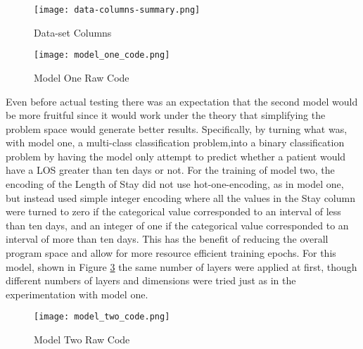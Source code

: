 \documentclass[sigconf,authorversion]{acmart}
\begin{document}
%
\begin{figure}[h]
    \centering
    \texttt{[image: data-columns-summary.png]}
    \caption{Data-set Columns}
    \label{fig: dataset cols}
\end{figure}
\begin{figure}[h]
    \centering
    \texttt{[image: model\_one\_code.png]}
    \caption{Model One Raw Code}
    \label{fig: code_model_one}
\end{figure}
%
\noindent Even before actual testing there was an expectation that the second model would be more fruitful since it would work under the theory that simplifying the problem space would generate better results. Specifically, by turning what was, with model one, a multi-class classification problem,into a binary classification problem by having the model only attempt to predict whether a patient would have a LOS greater than ten days or not. For the training of model two, the encoding of the Length of Stay did not use hot-one-encoding, as in model one, but instead used simple integer encoding where all the values in the Stay column were turned to zero if the categorical value corresponded to an interval of less than ten days, and an integer of one if the categorical value corresponded to an interval of more than ten days. This has the benefit of reducing the overall program space and allow for more resource efficient training epochs. For this model, shown in Figure \ref{fig: code_model_two} the same number of layers were applied at first, though different numbers of layers and dimensions were tried just as in the experimentation with model one. 
%
\begin{figure}[h]
    \centering
    \texttt{[image: model\_two\_code.png]}
    \caption{Model Two Raw Code}
    \label{fig: code_model_two}
\end{figure}
%
\end{document}
